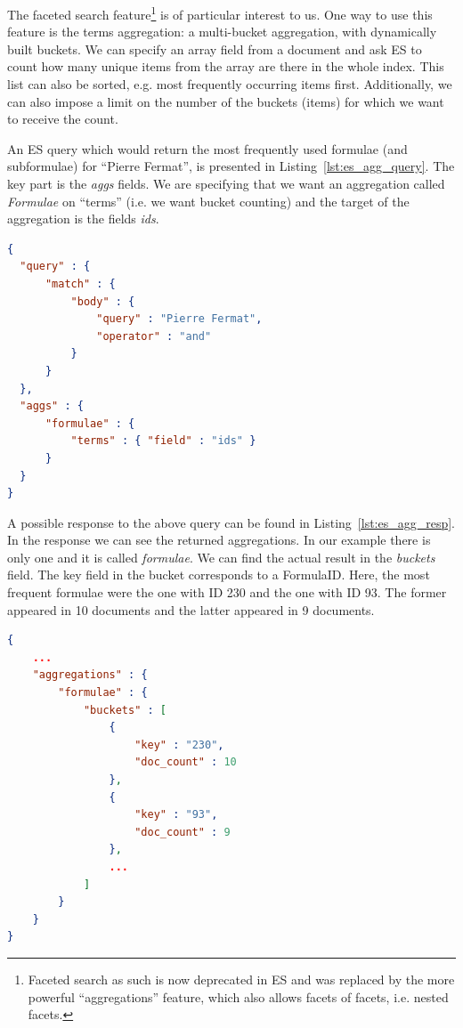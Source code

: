 \documentclass[a4paper,oneside]{article}
\begin{document}
The faceted search feature\footnote{Faceted search as such is now deprecated in
ES and was replaced by the more powerful ``aggregations'' feature, which
also allows facets of facets, i.e. nested facets.} is of
particular interest to us. 
One way to use this feature is the terms aggregation: a multi-bucket
aggregation, with dynamically built buckets.  We can specify an array field
from a document and ask ES to count how many unique items from the array are
there in the whole index.  This list can also be sorted, e.g. most frequently
occurring items first.  Additionally, we can also impose a limit on the number
of the buckets (items) for which we want to receive the count.

An ES query which would return the most frequently used formulae (and
subformulae) for ``Pierre Fermat'', is presented in
Listing~\ref{lst:es_agg_query}. The key part is the \emph{aggs} fields. We are
specifying that we want an aggregation called \textit{Formulae} on ``terms''
(i.e. we want bucket counting) and the target of the aggregation is the fields
\emph{ids}.

\begin{lstlisting}[language=json,firstnumber=1,caption=Elastic Search Term
Aggregation Query, captionpos=b, label=lst:es_agg_query]
{
  "query" : {
      "match" : {
          "body" : {
              "query" : "Pierre Fermat",
              "operator" : "and"
          }
      }
  },
  "aggs" : {
      "formulae" : {
          "terms" : { "field" : "ids" }
      }
  }
}
\end{lstlisting}

A possible response to the above query can be found in
Listing~\ref{lst:es_agg_resp}. In the response we can see the returned
aggregations. In our example there is only one and it is called
\emph{formulae}. We can find the actual result in the \emph{buckets} field. The
\textsf{key} field in the bucket corresponds to a \textsf{FormulaID}.
Here, the most frequent formulae were the one with ID 230 and the one with ID
93. The former appeared in 10 documents and the latter appeared in 9 documents.

\begin{lstlisting}[language=json,firstnumber=1,caption=Elastic Search Term
Aggregation Response, captionpos=b, label=lst:es_agg_resp]
{
    ...
    "aggregations" : {
        "formulae" : {
            "buckets" : [
                {
                    "key" : "230",
                    "doc_count" : 10
                },
                {
                    "key" : "93",
                    "doc_count" : 9
                },
                ...
            ]
        }
    }
}
\end{lstlisting}
\end{document}
